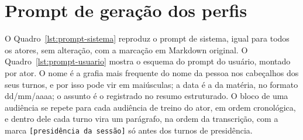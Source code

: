 \section{Prompt de geração dos perfis}
\label{ap:prompt}

O Quadro~\ref{lst:prompt-sistema} reproduz o prompt de sistema, igual para todos os atores, sem
alteração, com a marcação em Markdown original. O Quadro~\ref{lst:prompt-usuario} mostra o esquema do
prompt do usuário, montado por ator. O nome é a grafia mais frequente do nome da pessoa nos cabeçalhos
dos seus turnos, e por isso pode vir em maiúsculas; a data é a da matéria, no formato dd/mm/aaaa; o
assunto é o registrado no resumo estruturado. O bloco de uma audiência se repete para cada audiência de treino do ator,
em ordem cronológica, e dentro dele cada turno vira um parágrafo, na ordem da transcrição, com a marca
\texttt{[presidência da sessão]} só antes dos turnos de presidência.


